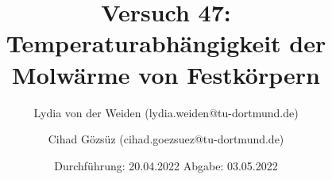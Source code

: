

\subject{Fortgeschrittenenpraktikum der Fakultät Physik}
\title{Versuch 47: Temperaturabhängigkeit der Molwärme von Festkörpern}
\author{Lydia von der Weiden (lydia.weiden@tu-dortmund.de) \and Cihad Gözsüz (cihad.goezsuez@tu-dortmund.de)}
\date{%
  Durchführung: 20.04.2022
  \hspace{3em}
  Abgabe: 03.05.2022
}
\publishers{TU Dortmund – Fakultät Physik}


\maketitle
\thispagestyle{empty}
\tableofcontents
\newpage





\newpage
\printbibliography{}


